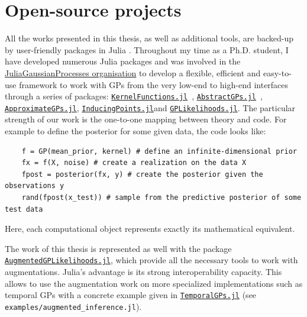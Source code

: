 \section{Open-source projects}

All the works presented in this thesis, as well as additional tools, are backed-up by user-friendly packages in Julia \cite{Julia-2017}.
Throughout my time as a Ph.D. student, I have developed numerous Julia packages and was involved in the \href{https://github.com/JuliaGaussianProcesses}{JuliaGaussianProcesses organisation} to develop a flexible, efficient and easy-to-use framework to work with \ac{GPs} from the very low-end to high-end interfaces through a series of packages: \href{https://github.com/JuliaGaussianProcesses/KernelFunctions.jl}{\texttt{KernelFunctions.jl}}~\cite{theo_galy_fajou_2022_6246597}, \href{https://github.com/JuliaGaussianProcesses/AbstractGPs.jl}{\texttt{AbstractGPs.jl}}~\cite{david_widmann_2022_5939997}, \href{https://github.com/JuliaGaussianProcesses/ApproximateGPs.jl}{\texttt{ApproximateGPs.jl}}, \href{https://github.com/JuliaGaussianProcesses/InducingPoints.jl}{\texttt{InducingPoints.jl}}and \href{https://github.com/JuliaGaussianProcesses/GPLikelihoods.jl}{\texttt{GPLikelihoods.jl}}.
The particular strength of our work is the one-to-one mapping between theory and code.
For example to define the posterior for some given data, the code looks like:
\begin{verbatim}
    f = GP(mean_prior, kernel) # define an infinite-dimensional prior
    fx = f(X, noise) # create a realization on the data X
    fpost = posterior(fx, y) # create the posterior given the observations y
    rand(fpost(x_test)) # sample from the predictive posterior of some test data
\end{verbatim}
Here, each computational object represents exactly its mathematical equivalent.

The work of this thesis is represented as well with the package \href{https://github.com/JuliaGaussianProcesses/AugmentedGPLikelihoods.jl}{\texttt{AugmentedGPLikelihoods.jl}}, which provide all the necessary tools to work with augmentations.
Julia's advantage is its strong interoperability capacity.
This allows to use the augmentation work on more specialized implementations such as temporal \ac{GPs} with a concrete example given in \href{https://github.com/JuliaGaussianProcesses/TemporalGPs.jl}{\texttt{TemporalGPs.jl}} (see \texttt{examples/augmented\_inference.jl}).


